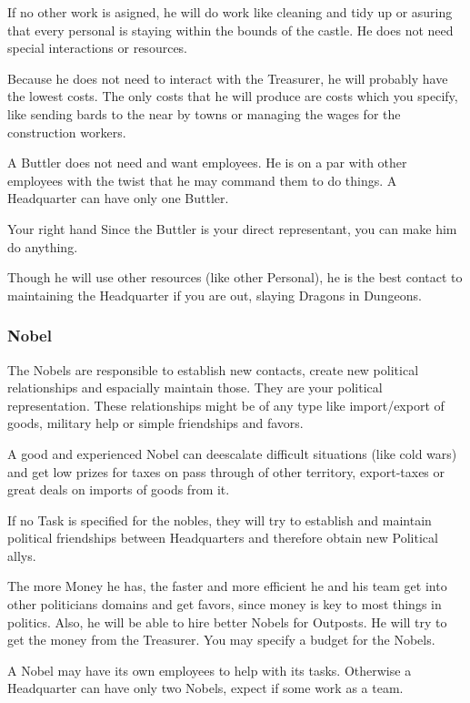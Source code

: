 If no other work is asigned, he will do work like cleaning and tidy up or asuring that every personal is staying within the bounds of the castle. He does not need special interactions or resources. 

Because he does not need to interact with the Treasurer, he will probably have the lowest costs. The only costs that he will produce are costs which you specify, like sending bards to the near by towns or managing the wages for the construction workers.

A Buttler does not need and want employees. He is on a par with other employees with the twist that he may command them to do things. A Headquarter can have only one Buttler.

\begin{paperbox}{Your right hand}
Since the Buttler is your direct representant, you can make him do anything. 

Though he will use other resources (like other Personal), he is the best contact to maintaining the Headquarter if you are out, slaying Dragons in Dungeons.
\end{paperbox}

\subsubsection{Nobel}

The Nobels are responsible to establish new contacts, create new political relationships and espacially maintain those. They are your political representation. These relationships might be of any type like import/export of goods, military help or simple friendships and favors.

A good and experienced Nobel can deescalate difficult situations (like cold wars) and get low prizes for taxes on pass through of other territory, export-taxes or great deals on imports of goods from it.

If no Task is specified for the nobles, they will try to establish and maintain political friendships between Headquarters and therefore obtain new Political allys.

The more Money he has, the faster and more efficient he and his team get into other politicians domains and get favors, since money is key to most things in politics. Also, he will be able to hire better Nobels for Outposts. He will try to get the money from the Treasurer. You may specify a budget for the Nobels.

A Nobel may have its own employees to help with its tasks. Otherwise a Headquarter can have only two Nobels, expect if some work as a team.

